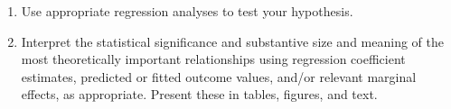 \documentclass[a4paper,11pt]{article}
\begin{document}
\begin{enumerate}
\item Use appropriate regression analyses to test your hypothesis.

\item Interpret the statistical significance and substantive size and meaning of the most theoretically important relationships using regression coefficient estimates, predicted or fitted outcome values, and/or relevant marginal effects, as appropriate. Present these in tables, figures, and text.

\end{enumerate}
\end{document}
